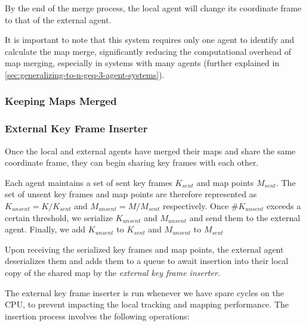 By the end of the merge process, the local agent will change its coordinate frame to that of the external agent.

It is important to note that this system requires only one agent to identify and calculate the map merge, significantly reducing the computational overhead of map merging, especially in systems with many agents (further explained in \autoref{sec:generalizing-to-n-geq-3-agent-systems}).

\subsubsection{Keeping Maps Merged}

\subsubsection{External Key Frame Inserter}
\label{sec:external-key-frame-inserter}
Once the local and external agents have merged their maps and share the same coordinate frame, they can begin sharing key frames with each other.

Each agent maintains a set of sent key frames $K_{sent}$ and map points $M_{sent}$. The set of unsent key frames and map points are therefore represented as $K_{unsent} = K / K_{sent}$ and $M_{unsent} = M / M_{sent}$ respectively. Once $\#K_{unsent}$ exceeds a certain threshold, we serialize $K_{unsent}$ and $M_{unsent}$ and send them to the external agent. Finally, we add $K_{unsent}$ to $K_{sent}$ and $M_{unsent}$ to $M_{sent}$

Upon receiving the serialized key frames and map points, the external agent deserializes them and adds them to a queue to await insertion into their local copy of the shared map by the \textit{external key frame inserter}.

The external key frame inserter is run whenever we have spare cycles on the CPU, to prevent impacting the local tracking and mapping performance. The insertion process involves the following operations:

